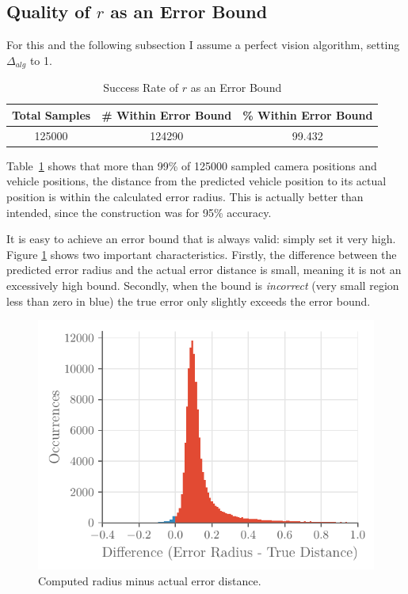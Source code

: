 \documentclass[a4paper,12pt,twoside,openright]{report}
\begin{document}
\subsection{Quality of $r$ as an Error Bound}

For this and the following subsection I assume a perfect vision algorithm,
setting $\Delta_{alg}$ to 1.

\begin{table}[htb]
    \centering
    \caption[$r$ as an Error Bound]{Success Rate of $r$ as an Error Bound}
    \label{tab:camera:bound accuracy}
    \begin{tabular}{@{}ccc@{}}
        \toprule
        Total Samples & \# Within Error Bound & \% Within Error Bound \\ \midrule
        125000              & 124290                  & 99.432 
    \end{tabular}
\end{table}

Table~\ref{tab:camera:bound accuracy} shows that more than 99\% of 125000 sampled camera positions
and vehicle positions, the distance from the predicted vehicle position to 
its actual position is within the calculated error radius. This
is actually better than intended, since the construction was for 95\% accuracy.

It is easy to achieve an error bound that is always valid: simply set it very high.
Figure \ref{fig:camera:diff bound error} shows two important characteristics. Firstly, the difference between
the predicted error radius and the actual error distance is small, meaning
it is not an excessively high bound. Secondly, when the bound is \textit{incorrect} (very small region less than zero in blue)
the true error only slightly exceeds the error bound.

\begin{figure}[htb]
    \begin{center}
        \includegraphics{figures/camera/diff_radius_true_error.pdf}
    \end{center}
    \caption[Bound Minus True Distance]{Computed radius minus actual error distance.}
    \label{fig:camera:diff bound error}
\end{figure}
\end{document}
